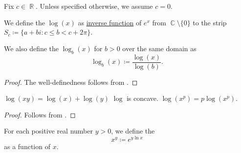 \begin{definition}\label{def:logarithm}
  Fix \( c \in \BbbR \). Unless specified otherwise, we assume \( c = 0 \).

  We define the  \( \log(x) \) as \hyperref[def:set_valued_map/inverse]{inverse function} of \( e^x \) from \( \BbbC \setminus \{ 0 \} \) to the strip \( S_c \coloneqq \{ a + bi \colon c \leq b < c + 2\pi \} \).

  We also define the  \( \log_b(x) \) for \( b > 0 \) over the same domain as
  \begin{equation*}
    \log_b(x) \coloneqq \frac {\log(x)} {\log(b)}.
  \end{equation*}
\end{definition}
\begin{proof}
  The well-definedness follows from .
\end{proof}

\begin{proposition}\label{thm:def:logarithm}
  \hfill
  \begin{thmenum}
     \( \log(xy) = \log(x) + \log(y) \)
     \( \log \) is concave.
     \( \log(x^p) = p \log(x^p) \).
  \end{thmenum}
\end{proposition}
\begin{proof}
   Follows from .
\end{proof}

\begin{definition}\label{def:power_function}
  For each positive real number \( y > 0 \), we define the 
  \begin{equation*}
    x^y \coloneqq e^{y \ln x}
  \end{equation*}
  as a function of \( x \).
\end{definition}

